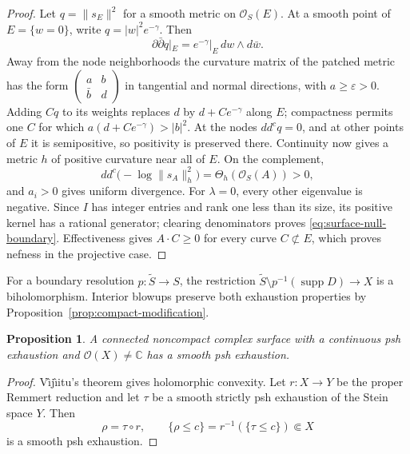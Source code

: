 \documentclass[11pt]{amsart}
\newtheorem{proposition}[theorem]{Proposition}
\theoremstyle{definition}
\theoremstyle{remark}
\numberwithin{equation}{section}
\newcommand{\C}{\mathbb C}
\newcommand{\OO}{\mathcal O}
\newcommand{\ddc}{dd^c}
\newcommand{\supp}{\operatorname{supp}}
\begin{document}
\begin{proof}
Let $q=\|s_E\|^2$ for a smooth metric on $\OO_S(E)$.
At a smooth point of $E=\{w=0\}$, write $q=|w|^2e^{-\gamma}$.
Then
\[
 \partial\bar\partial q|_E
   =e^{-\gamma}|_E\,dw\wedge d\bar w.
\]
Away from the node neighborhoods the curvature matrix of the
patched metric has the form
$\left(\begin{smallmatrix}a&b\\\bar b&d\end{smallmatrix}\right)$
in tangential and normal directions, with $a\ge\varepsilon>0$.
Adding $Cq$ to its weights replaces $d$ by
$d+Ce^{-\gamma}$ along $E$; compactness permits one $C$ for which
$a(d+Ce^{-\gamma})>|b|^2$. At the nodes $\ddc q=0$, and at other
points of $E$ it is semipositive, so positivity is preserved there.
Continuity now gives a metric $h$ of positive curvature near all
of $E$. On the complement,
\[
 \ddc\bigl(-\log\|s_A\|_h^2\bigr)=\Theta_h(\OO_S(A))>0,
\]
and $a_i>0$ gives uniform divergence. For $\lambda=0$, every other
eigenvalue is negative. Since $I$ has integer entries and rank one
less than its size, its positive kernel has a rational generator;
clearing denominators proves \eqref{eq:surface-null-boundary}.
Effectiveness gives $A\cdot C\ge0$ for every curve $C\not\subset E$,
which proves nefness in the projective case.
\end{proof}

For a boundary resolution $p:\widetilde S\to S$, the restriction
$\widetilde S\setminus p^{-1}(\supp D)\to X$ is a biholomorphism.
Interior blowups preserve both exhaustion properties by
Proposition~\ref{prop:compact-modification}.

\begin{proposition}\label{prop:surface-nonconstant-function}
A connected noncompact complex surface with a continuous psh
exhaustion and $\OO(X)\ne\C$ has a smooth psh exhaustion.
\end{proposition}
\begin{proof}
V\^{\i}j\^{\i}itu's theorem \cite[Theorem~1.1]{Vajaitu2022} gives
holomorphic convexity. Let $r:X\to Y$ be the proper Remmert
reduction and let $\tau$ be a smooth strictly psh exhaustion of the
Stein space $Y$. Then
\[
 \rho=\tau\circ r,\qquad
 \{\rho\le c\}=r^{-1}(\{\tau\le c\})\Subset X
\]
is a smooth psh exhaustion.
\end{proof}
\end{document}
